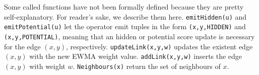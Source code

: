 Some called functions have not been formally defined because they are pretty self-explanatory. For reader's sake, we describe them here. \texttt{emitHidden(u)} and \texttt{emitPotential(u)} let the operator emit tuples in the form \texttt{(x,y,HIDDEN)} and \texttt{(x,y,POTENTIAL)}, meaning that an hidden or potential score update is necessary for the edge $(x,y)$, respectively.
\texttt{updateLink(x,y,w)} updates the existent edge $(x,y)$ with the new EWMA weight value. 
\texttt{addLink(x,y,w)} inserts the edge $(x,y)$ with weight $w$. 
\texttt{Neighbours(x)} return the set of neighbours of $x$.
